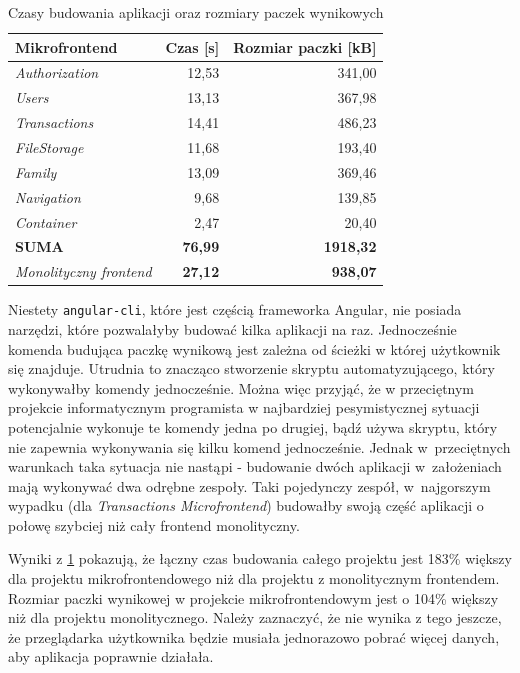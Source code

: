 \documentclass{SGGW-thesis}
\begin{document}
{    \begin{table}[h]
      \centering
      \caption{Czasy budowania aplikacji oraz rozmiary paczek wynikowych}
      \begin{tabular}{|l||r|r|}
      \hline
      \textbf{Mikrofrontend} & \multicolumn{1}{l|}{\textbf{Czas {[}s{]}}} & \multicolumn{1}{l|}{\textbf{Rozmiar paczki {[}kB{]}}} \\ \hline
      \textit{Authorization} & 12,53 & 341,00 \\ \hline
      \textit{Users} & 13,13 & 367,98 \\ \hline
      \textit{Transactions} & 14,41 & 486,23 \\ \hline
      \textit{FileStorage} & 11,68 & 193,40 \\ \hline
      \textit{Family} & 13,09 & 369,46 \\ \hline
      \textit{Navigation} & 9,68 & 139,85 \\ \hline
      \textit{Container} & 2,47 & 20,40 \\ \hline
       \textbf{SUMA} & \textbf{76,99} & \textbf{1918,32} \\ \hline\hline
       \textit{Monolityczny frontend} & \textbf{27,12} & \textbf{938,07} \\ \hline
      \end{tabular}
      \label{table:build_times}
    \end{table}

    Niestety \lstinline{angular-cli}, które jest częścią frameworka Angular, nie posiada narzędzi, które pozwalałyby budować kilka aplikacji na raz. Jednocześnie komenda budująca paczkę wynikową jest zależna od ścieżki w której użytkownik się znajduje. Utrudnia to znacząco stworzenie skryptu automatyzującego, który wykonywałby komendy jednocześnie. Można więc przyjąć, że w przeciętnym projekcie informatycznym programista w najbardziej pesymistycznej sytuacji potencjalnie wykonuje te komendy jedna po drugiej, bądź używa skryptu, który nie zapewnia wykonywania się kilku komend jednocześnie. Jednak w~przeciętnych warunkach taka sytuacja nie nastąpi - budowanie dwóch aplikacji w~założeniach mają wykonywać dwa odrębne zespoły. Taki pojedynczy zespół, w~najgorszym wypadku (dla \textit{Transactions Microfrontend}) budowałby swoją część aplikacji o połowę szybciej niż cały frontend monolityczny.

    Wyniki z \cref{table:build_times} pokazują, że łączny czas budowania całego projektu jest 183\% większy dla projektu mikrofrontendowego niż dla projektu z monolitycznym frontendem. Rozmiar paczki wynikowej w projekcie mikrofrontendowym jest o 104\% większy niż dla projektu monolitycznego. Należy zaznaczyć, że nie wynika z tego jeszcze, że przeglądarka użytkownika będzie musiała jednorazowo pobrać więcej danych, aby aplikacja poprawnie działała.

}
\end{document}
